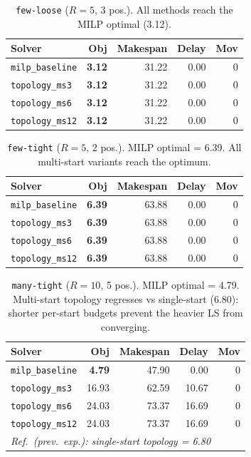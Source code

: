 \begin{table}[H]
\centering
\caption{\texttt{few-loose} ($R=5$, 3 pos.).  All methods reach the MILP
         optimal (3.12).}
\label{tab:ms-few-loose}
\begin{tabular}{lrrrr}
\toprule
Solver & Obj & Makespan & Delay & Mov \\
\midrule
\texttt{milp\_baseline}  & \textbf{3.12} & 31.22 & 0.00 & 0 \\
\texttt{topology\_ms3}   & \textbf{3.12} & 31.22 & 0.00 & 0 \\
\texttt{topology\_ms6}   & \textbf{3.12} & 31.22 & 0.00 & 0 \\
\texttt{topology\_ms12}  & \textbf{3.12} & 31.22 & 0.00 & 0 \\
\bottomrule
\end{tabular}
\end{table}

\begin{table}[H]
\centering
\caption{\texttt{few-tight} ($R=5$, 2 pos.).  MILP optimal = 6.39.
         All multi-start variants reach the optimum.}
\label{tab:ms-few-tight}
\begin{tabular}{lrrrr}
\toprule
Solver & Obj & Makespan & Delay & Mov \\
\midrule
\texttt{milp\_baseline}  & \textbf{6.39} & 63.88 & 0.00 & 0 \\
\texttt{topology\_ms3}   & \textbf{6.39} & 63.88 & 0.00 & 0 \\
\texttt{topology\_ms6}   & \textbf{6.39} & 63.88 & 0.00 & 0 \\
\texttt{topology\_ms12}  & \textbf{6.39} & 63.88 & 0.00 & 0 \\
\bottomrule
\end{tabular}
\end{table}

\begin{table}[H]
\centering
\caption{\texttt{many-tight} ($R=10$, 5 pos.).  MILP optimal = 4.79.
         Multi-start topology regresses vs single-start (6.80): shorter
         per-start budgets prevent the heavier LS from converging.}
\label{tab:ms-pl10}
\begin{tabular}{lrrrr}
\toprule
Solver & Obj & Makespan & Delay & Mov \\
\midrule
\texttt{milp\_baseline}  & \textbf{4.79}  & 47.90 &  0.00 & 0 \\
\texttt{topology\_ms3}   & 16.93          & 62.59 & 10.67 & 0 \\
\texttt{topology\_ms6}   & 24.03          & 73.37 & 16.69 & 0 \\
\texttt{topology\_ms12}  & 24.03          & 73.37 & 16.69 & 0 \\
\midrule
\multicolumn{5}{l}{\small\textit{Ref.\ (prev.\ exp.): single-start topology = 6.80}} \\
\bottomrule
\end{tabular}
\end{table}

